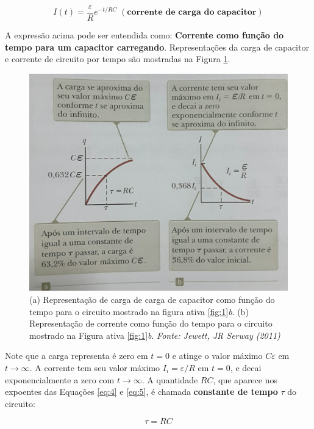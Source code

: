 \documentclass[a4paper,12pt]{article}
\begin{document}
\begin{equation} \label{eq:5}
I(t) = \frac{\varepsilon}{R}e^{-t/RC}\;(\textbf{corrente de carga do capacitor})
\end{equation}

A expressão acima pode ser entendida como: \textbf{Corrente como função do tempo para um capacitor carregando}.
Representações da carga de capacitor e corrente de circuito por tempo são mostradas na Figura \ref{fig:2}. 

\begin{figure}[htp]
\centering
\includegraphics[width=15cm]{fig2}
\caption{(a) Representação de carga de carga de capacitor como função do tempo para o circuito mostrado na figura ativa \ref{fig:1}\textit{b}. (b) Representação de corrente como função do tempo para o circuito mostrado na Figura ativa \ref{fig:1}\textit{b}. \textit{Fonte: Jewett, JR Serway (2011)\cite{jeewett11}}}
\label{fig:2}
\end{figure}

Note que a carga representa é zero em $t=0$ e atinge o valor máximo $C\varepsilon$ em $t \to \infty$. A corrente tem seu valor máximo $I_i=\varepsilon / R$  em $t=0$, e decai exponencialmente a zero com $t \to \infty$. A quantidade $RC$, que aparece nos expoentes das Equações \ref{eq:4} e \ref{eq:5}, é chamada \textbf{constante de tempo} $\tau$ do circuito:

\begin{equation}\label{eq:6}
\tau = RC
\end{equation}
\end{document}
